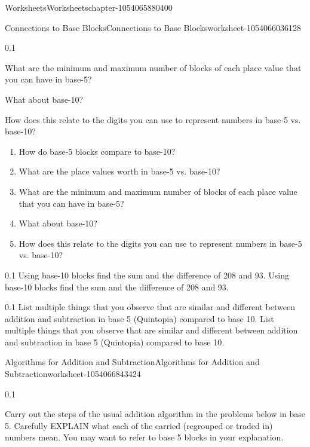 \documentclass[twoside,11pt,]{book}
\begin{document}
\begin{chapterptx}{Worksheets}{}{Worksheets}{}{}{chapter-1054065880400}
\begin{worksheet-section-numberless}{Connections to Base Blocks}{}{Connections to Base Blocks}{}{}{worksheet-1054066036128}
\begin{divisionexercise}{4}{}{0.1}
{        What are the minimum and maximum number of blocks of each place value that you can have in base-5?
      
        What about base-10?
      
        How does this relate to the digits you can use to represent numbers in base-5 vs. base-10?
      }%
\leavevmode%
\begin{enumerate}[label=(\alph*)]
\item\hypertarget{li-1054064282896}{}How do base-5 blocks compare to base-10?%
\item\hypertarget{li-1054064273488}{}What are the place values worth in base-5 vs. base-10?%
\item\hypertarget{li-1054064263888}{}What are the minimum and maximum number of blocks of each place value that you can have in base-5?%
\item\hypertarget{li-1054064336240}{}What about base-10?%
\item\hypertarget{li-1054064336656}{}How does this relate to the digits you can use to represent numbers in base-5 vs. base-10?%
\end{enumerate}
\end{divisionexercise}%
\begin{divisionexercise}{5}{}{0.1}{
        Using base-10 blocks find the sum and the difference of 208 and 93.
      }%
\hypertarget{p-1054064352640}{}%
Using base-10 blocks find the sum and the difference of 208 and 93.%
\end{divisionexercise}%
\begin{divisionexercise}{6}{}{0.1}{
        List multiple things that you observe that are similar and different between addition and subtraction in base 5 (Quintopia) compared to base 10.
      }%
\hypertarget{p-1054066879264}{}%
List multiple things that you observe that are similar and different between addition and subtraction in base 5 (Quintopia) compared to base 10.%
\end{divisionexercise}%
\end{worksheet-section-numberless}
\restoregeometry
%
%
\typeout{************************************************}
\typeout{************************************************}
%
\begin{worksheet-section-numberless}{Algorithms for Addition and Subtraction}{}{Algorithms for Addition and Subtraction}{}{}{worksheet-1054066843424}
\begin{divisionexercise}{1}{}{0.1}{
        Carry out the steps of the usual addition algorithm in the problems below in base 5.  Carefully EXPLAIN what each of the carried (regrouped or traded in) numbers mean.  You may want to refer to base 5 blocks in your explanation.
      
}
\end{divisionexercise}
\end{worksheet-section-numberless}
\end{chapterptx}
\end{document}
